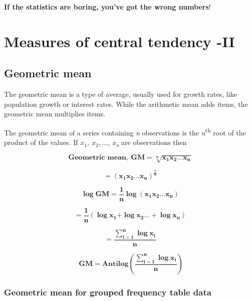 \documentclass[
]{book}
\begin{document}
\hypertarget{hello}{}
\textbf{If the statistics are boring, you've got the wrong numbers}!

\hypertarget{measures-of-central-tendency--ii}{%
\chapter{Measures of central tendency -II}\label{measures-of-central-tendency--ii}}

\hypertarget{geometric-mean}{%
\section{Geometric mean}\label{geometric-mean}}

The geometric mean is a type of average, usually used for growth rates,
like population growth or interest rates. While the arithmetic mean adds
items, the geometric mean multiplies items.

The geometric mean of a series containing \emph{n} observations is the
\emph{n}\textsuperscript{th} root of the product of the values. If
\(x_{1},\ x_{2},\ldots,\ x_{n}\ \)are observations then

\[\mathbf{\text{Geometric mean}}\mathbf{,\ }\mathbf{GM =}\sqrt[\mathbf{n}]{\mathbf{x}_{\mathbf{1}}\mathbf{x}_{\mathbf{2}}\mathbf{\ldots}\mathbf{x}_{\mathbf{n}}}\]

\[\mathbf{=}\left( \mathbf{x}_{\mathbf{1}}\mathbf{x}_{\mathbf{2}}\mathbf{\ldots}\mathbf{x}_{\mathbf{n}} \right)^{\frac{\mathbf{1}}{\mathbf{n}}}\]

\[\mathbf{\log}\mathbf{\text{GM}}\mathbf{=}\frac{\mathbf{1}}{\mathbf{n}}\mathbf{\log}\left( \mathbf{x}_{\mathbf{1}}\mathbf{x}_{\mathbf{2}}\mathbf{\ldots}\mathbf{x}_{\mathbf{n}} \right)\]

\[\mathbf{=}\frac{\mathbf{1}}{\mathbf{n}}\left( \mathbf{\log}\mathbf{x}_{\mathbf{1}}\mathbf{+}\mathbf{\log}\mathbf{x}_{\mathbf{2}}\mathbf{\ldots +}\mathbf{\log}\mathbf{x}_{\mathbf{n}} \right)\]

\[\mathbf{=}\frac{\sum_{\mathbf{i = 1}}^{\mathbf{n}}{\mathbf{\log}\mathbf{x}_{\mathbf{i}}}}{\mathbf{n}}\]

\[\mathbf{\ GM = Antilog}\left( \frac{\sum_{\mathbf{i = 1}}^{\mathbf{n}}{\mathbf{\log}\mathbf{x}_{\mathbf{i}}}}{\mathbf{n}} \right)\]

\hypertarget{geometric-mean-for-grouped-frequency-table-data}{%
\subsection{Geometric mean for grouped frequency table data}\label{geometric-mean-for-grouped-frequency-table-data}}
\end{document}
